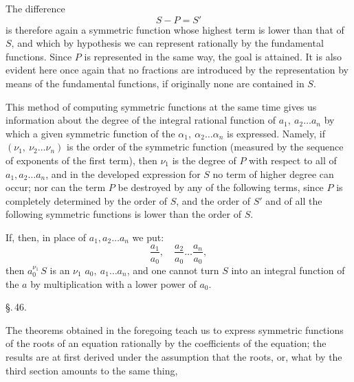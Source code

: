 The difference
\[
S - P = S'
\]
is therefore again a symmetric function whose highest term is
lower than that of $S$, and which by hypothesis we can represent
rationally by the fundamental functions.
Since $P$ is represented in the same way, the goal is attained. It is
also evident here once again that no fractions are introduced by the
representation by means of the fundamental functions, if originally
none are contained in $S$.

This method of computing symmetric functions at the same
time gives us information about the degree of the integral rational
function of $a_1,\ a_2 \ldots a_n$ by which a given
symmetric function of the $\alpha_1,\ \alpha_2 \ldots \alpha_n$ is expressed.
Namely, if $(\nu_1,\ \nu_2 \ldots \nu_n)$ is the order of the symmetric
function (measured by the sequence of exponents of the first
term), then $\nu_1$ is the degree of $P$ with respect to all of
$a_1, a_2 \ldots a_n$, and in the developed expression for $S$ no
term of higher degree can occur; nor can the term $P$ be
destroyed by any of the following terms, since $P$ is completely
determined by the order of $S$, and the order of $S'$
and of all the following symmetric functions is lower than
the order of $S$.

If, then, in place of $a_1, a_2 \ldots a_n$ we put:
\[
\frac{a_1}{a_0},\quad \frac{a_2}{a_0} \ldots \frac{a_n}{a_0},
\]
then $a_0^{\nu_1}\,S$ is an  $\nu_1$  $a_0,\ a_1 \ldots a_n$, and one cannot turn $S$ into an integral
function of the $a$ by multiplication with a lower power of $a_0$.

\begin{center}
\S.\,46.

\end{center}

The theorems obtained in the foregoing teach us to express
symmetric functions of the roots of an equation rationally by
the coefficients of the equation; the results are
at first derived under the assumption that the roots,
or, what by the third section amounts to the same thing,

